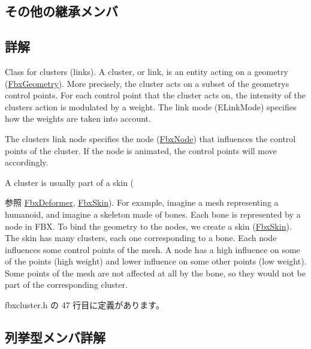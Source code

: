 \subsection*{その他の継承メンバ}


\subsection{詳解}
Class for clusters (links). A cluster, or link, is an entity acting on a geometry (\hyperlink{class_fbx_geometry}{Fbx\+Geometry}). More precisely, the cluster acts on a subset of the geometry\textquotesingle{}s control points. For each control point that the cluster acts on, the intensity of the cluster\textquotesingle{}s action is modulated by a weight. The link mode (E\+Link\+Mode) specifies how the weights are taken into account.

The cluster\textquotesingle{}s link node specifies the node (\hyperlink{class_fbx_node}{Fbx\+Node}) that influences the control points of the cluster. If the node is animated, the control points will move accordingly.

A cluster is usually part of a skin (\begin{DoxySeeAlso}{参照}
\hyperlink{class_fbx_deformer}{Fbx\+Deformer}, \hyperlink{class_fbx_skin}{Fbx\+Skin}). For example, imagine a mesh representing a humanoid, and imagine a skeleton made of bones. Each bone is represented by a node in F\+BX. To bind the geometry to the nodes, we create a skin (\hyperlink{class_fbx_skin}{Fbx\+Skin}). The skin has many clusters, each one corresponding to a bone. Each node influences some control points of the mesh. A node has a high influence on some of the points (high weight) and lower influence on some other points (low weight). Some points of the mesh are not affected at all by the bone, so they would not be part of the corresponding cluster. 
\end{DoxySeeAlso}


 fbxcluster.\+h の 47 行目に定義があります。



\subsection{列挙型メンバ詳解}
\mbox{\label{class_fbx_cluster_aaa2afaedfd33eda65c46bb5a3d04dab0}} 
